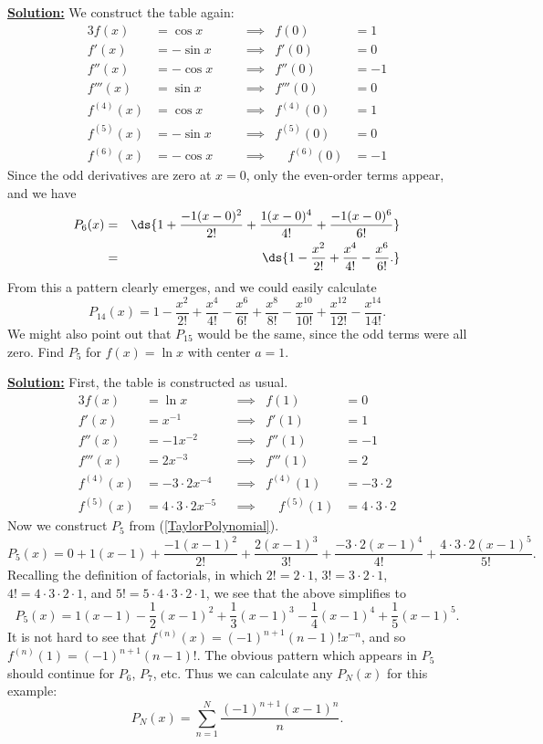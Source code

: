 \underline{\bf Solution:} We construct the table again:
\begin{alignat*}{3}
f(x)&=\cos x&\quad&\implies& f(0)&=1\\
f'(x)&=-\sin x&&\implies&f'(0)&=0\\
f''(x)&=-\cos x&&\implies&f''(0)&=-1\\
f'''(x)&=\sin x&&\implies&f'''(0)&=0\\
f^{(4)}(x)&=\cos x&&\implies&f^{(4)}(0)&=1\\
f^{(5)}(x)&=-\sin x&&\implies&f^{(5)}(0)&=0\\
f^{(6)}(x)&=-\cos x&&\implies&\quad f^{(6)}(0)&=-1\end{alignat*}
Since the odd derivatives are zero at $x=0$, only  the
even-order terms appear, and we have
\begin{eqnarray*}
P_6(x)&=&\ds{1+\frac{-1(x-0)^2}{2!}+\frac{1(x-0)^4}{4!}+\frac{-1(x-0)^6}{6!}}\\
&=&\ds{1-\frac{x^2}{2!}+\frac{x^4}{4!}-\frac{x^6}{6!}.}\end{eqnarray*} 
From this a pattern clearly emerges, and we could easily
calculate
$$P_{14}(x)=1-\frac{x^2}{2!}+\frac{x^4}{4!}-\frac{x^6}{6!} 
+\frac{x^8}{8!}-\frac{x^{10}}{10!}+\frac{x^{12}}{12!}-\frac{x^{14}}{14!}.$$
We might also point out that $P_{15}$ would be the same, since the odd terms
were all zero.
\eex
\bex
Find $P_5$ for $f(x)=\ln x$ with center  $a=1$.
\medskip

\underline{\bf Solution:}
First, the table is constructed as usual.
\begin{alignat*}{3}
f(x)&=\ln x&&\implies&f(1)&=0\\
f'(x)&=x^{-1}&&\implies&f'(1)&=1\\
f''(x)&=-1x^{-2}&&\implies&f''(1)&=-1\\
f'''(x)&=2x^{-3}&&\implies& f'''(1)&=2\\
f^{(4)}(x)&=-3\cdot2x^{-4}&&\implies&f^{(4)}(1)&=-3\cdot2\\
f^{(5)}(x)&=4\cdot3\cdot2x^{-5}&&\implies&\quad f^{(5)}(1)&=4\cdot3\cdot2
\end{alignat*}
Now we construct $P_5$ from (\ref{TaylorPolynomial}). 
$$P_5(x)=0+1(x-1)+\frac{-1(x-1)^2}{2!}
+\frac{2(x-1)^3}{3!}+\frac{-3\cdot2(x-1)^4}{4!}
+\frac{4\cdot3\cdot2(x-1)^5}{5!}.$$
Recalling the definition of factorials, in which
$2!=2\cdot1$, $3!=3\cdot2\cdot1$, $4!=4\cdot3\cdot2\cdot1$,
and $5!=5\cdot4\cdot3\cdot2\cdot1$,
we see that the above simplifies to
$$P_5(x)=1(x-1)-\frac12(x-1)^2+\frac13(x-1)^3-\frac14(x-1)^4+\frac15
(x-1)^5.$$
It is not hard to see that $f^{(n)}(x)=(-1)^{n+1}(n-1)!x^{-n}$,
and so $f^{(n)}(1)=(-1)^{n+1}(n-1)!.$  The obvious pattern
which appears in $P_5$ should continue for $P_6$, $P_7$, etc.
Thus we can calculate
any $P_N(x)$ for this example:
$$P_N(x)=\sum_{n=1}^N\frac{(-1)^{n+1}(x-1)^n}n.$$ 
\label{ln example}\eex


